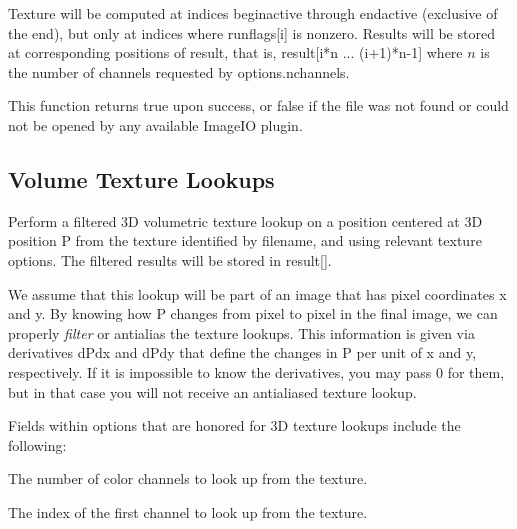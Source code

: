 Texture will be computed at indices {\cf beginactive} through
{\cf endactive} (exclusive of the end), but only at indices where {\cf runflags[i]}
is nonzero.  Results will be stored at corresponding positions of
{\cf result}, that is, 
{\cf result[i*n ... (i+1)*n-1]} where $n$ is the number of channels
requested by {\cf options.nchannels}.

This function returns {\cf true} upon success, or {\cf false} if the
file was not found or could not be opened by any available ImageIO
plugin.
\apiend

\newpage
\subsection{Volume Texture Lookups}
\label{sec:texturesys:api:texture3d}


Perform a filtered 3D volumetric texture lookup on a position centered at
3D position {\cf P} from the texture identified by
{\cf filename}, and using relevant texture {\cf options}.  The filtered
results will be stored in {\cf result[]}.

We assume that this lookup will be part of an image that has pixel
coordinates {\cf x} and {\cf y}.  By knowing how {\cf P} changes from
pixel to pixel in the final image, we can properly \emph{filter} or
antialias the texture lookups.  This information is given via
derivatives {\cf dPdx} and {\cf dPdy} that define the changes in {\cf P}
per unit of {\cf x} and {\cf y}, respectively.  If it is impossible to
know the derivatives, you may pass 0 for them, but in that case you will
not receive an antialiased texture lookup.

Fields within {\cf options} that are honored for 3D texture lookups
include the following:

\vspace{-12pt}
\vspace{10pt}
The number of color channels to look up from the texture.
\apiend

\vspace{-24pt}
\vspace{10pt}
The index of the first channel to look up from the texture.
\apiend

